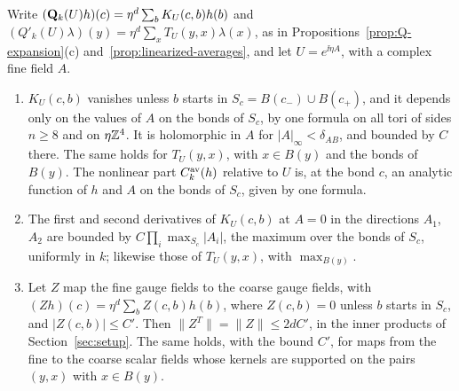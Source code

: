 \begin{lemma}\label{lem:ol-kernel-bounds}
Write $(\mathbf Q_k(U)h)(c)=\eta^d\sum_bK_U(c,b)h(b)$ and $(Q'_k(U)\lambda)(y)=\eta^d\sum_xT_U(y,x)\lambda(x)$, as in Propositions~\ref{prop:Q-expansion}(c) and~\ref{prop:linearized-averages}, and let $U=e^{\ii\eta A}$, with a complex fine field $A$.
\begin{enumerate}[label=(\alph*)]
\item $K_U(c,b)$ vanishes unless $b$ starts in $S_c=B(c_-)\cup B(c_+)$, and it depends only on the values of $A$ on the bonds of $S_c$, by one formula on all tori of sides $n\ge8$ and on $\eta\mathbb Z^4$. It is holomorphic in $A$ for $|A|_\infty<\delta_{AB}$, and bounded by $C$ there. The same holds for $T_U(y,x)$, with $x\in B(y)$ and the bonds of $B(y)$. The nonlinear part $C^{\rm av}_k(h)$ relative to $U$ is, at the bond $c$, an analytic function of $h$ and $A$ on the bonds of $S_c$, given by one formula.
\item The first and second derivatives of $K_U(c,b)$ at $A=0$ in the directions $A_1$, $A_2$ are bounded by $C\prod_i\max_{S_c}|A_i|$, the maximum over the bonds of $S_c$, uniformly in $k$; likewise those of $T_U(y,x)$, with $\max_{B(y)}$.
\item Let $Z$ map the fine gauge fields to the coarse gauge fields, with $(Zh)(c)=\eta^d\sum_bZ(c,b)h(b)$, where $Z(c,b)=0$ unless $b$ starts in $S_c$, and $|Z(c,b)|\le C'$. Then $\|Z^T\|=\|Z\|\le2dC'$, in the inner products of Section~\ref{sec:setup}. The same holds, with the bound $C'$, for maps from the fine to the coarse scalar fields whose kernels are supported on the pairs $(y,x)$ with $x\in B(y)$.
\end{enumerate}
\end{lemma}

